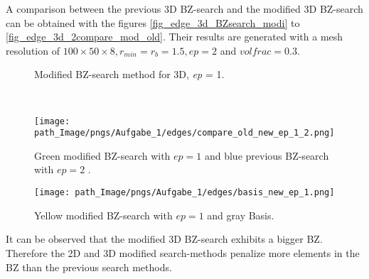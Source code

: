 A comparison between the previous 3D BZ-search and the modified 3D BZ-search can
 be obtained with the figures \ref{fig_edge_3d_BZsearch_modi} to
 \ref{fig_edge_3d_2compare_mod_old}.
 Their results are generated with a mesh resolution 
 of $100 \times 50 \times 8, r_{min} = r_{b} = 1.5, ep = 2$ and $ volfrac = 0.3$.
 

\begin{figure}[!h]
\centering
\begin{minipage}{0.8\textwidth}
 \def\svgwidth{\textwidth}
  
 \caption{Modified BZ-search method for 3D,  \emph{ep} = 1.} %
 \label{fig_edge_3d_search}
\end{minipage}\\
\vspace{0.5cm}
 \begin{minipage}{0.45\textwidth}
 \centering
 \texttt{[image: path\_Image/pngs/Aufgabe\_1/edges/compare\_old\_new\_ep\_1\_2.png]}
 	\caption{ Green modified BZ-search with $ep = 1$ and blue previous BZ-search with $ep = 2$ .} 
 	\label{fig_edges_comp_old_new_ep_1_2}
 \end{minipage}
 \hfill
 \begin{minipage}{0.45\textwidth}
 \centering
 \texttt{[image: path\_Image/pngs/Aufgabe\_1/edges/basis\_new\_ep\_1.png]}
 	\caption{ Yellow modified BZ-search with $ep = 1$ and gray Basis.}
 	\label{fig_edges_comp_new_ep_1}
 \end{minipage}
 \end{figure}   
 It can be observed that the modified 3D BZ-search exhibits a 
 bigger BZ. Therefore the 2D and 
 3D modified search-methods
 penalize more elements in the BZ than the previous search methods.\\

